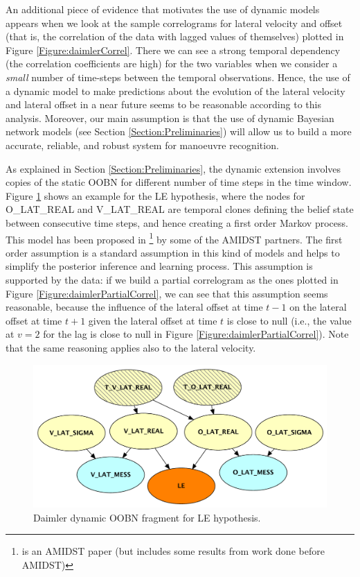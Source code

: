 An additional piece of evidence that motivates the use of dynamic models appears when we look at the sample correlograms for lateral velocity and offset (that is, the correlation of the data with lagged values of themselves) plotted in Figure \ref{Figure:daimlerCorrel}. There we can see a strong temporal dependency (the correlation coefficients are high) for the two variables when we consider a \textit{small} number of time-steps between the temporal observations. Hence, the use of a dynamic model to make predictions about the evolution of the lateral velocity and lateral offset in a near future seems to be reasonable according to this analysis. Moreover, our main assumption is that the use of dynamic Bayesian network models (see Section \ref{Section:Preliminaries}) will allow us to build a more accurate, reliable, and robust system for manoeuvre recognition. 

As explained in Section \ref{Section:Preliminaries}, the dynamic extension involves copies of the static OOBN for different number of time steps in the time window. Figure \ref{Figure:daimlerLEdyn} shows an example for the LE hypothesis, where the nodes for O\_LAT\_REAL and V\_LAT\_REAL are temporal clones defining the belief state between consecutive time steps, and hence creating a first order Markov process. This model has been proposed in \cite{Weidl2014}\footnote{\cite{Weidl2014} is an AMIDST paper (but includes some results from work done before AMIDST)} by some of the AMIDST partners. The first order assumption is a standard assumption in this kind of models and helps to simplify the posterior inference and learning process. This assumption is supported by the data: if we build a partial correlogram as the ones plotted in Figure \ref{Figure:daimlerPartialCorrel}, we can see that this assumption seems reasonable, because the influence of the lateral offset at time $t-1$ on the lateral offset at time $t+1$ given the lateral offset at time $t$ is close to null (i.e., the value at $v=2$ for the lag is close to null in Figure \ref{Figure:daimlerPartialCorrel}). Note that the same reasoning applies also to the lateral velocity.

\begin{figure}[ht!]
\begin{center}
\includegraphics[scale=0.48]{./figures/DaimlerLEdyn}
\end{center}
\caption{\label{Figure:daimlerLEdyn}Daimler dynamic OOBN fragment for LE hypothesis.}
\end{figure}

